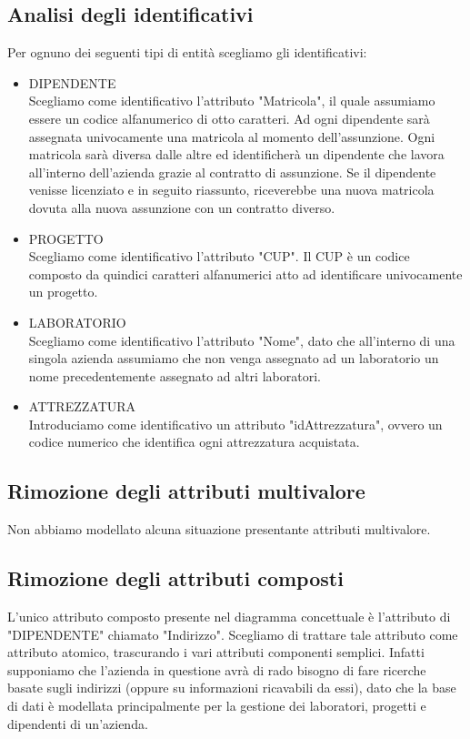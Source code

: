         \subsection{Analisi degli identificativi}
            Per ognuno dei seguenti tipi di entità scegliamo gli identificativi:
            \begin{itemize}
                \item DIPENDENTE\\
                Scegliamo come identificativo l'attributo "Matricola", il quale assumiamo essere un codice alfanumerico di otto caratteri.
                Ad ogni dipendente sarà assegnata univocamente una matricola al momento dell'assunzione. Ogni matricola sarà diversa dalle altre ed identificherà un dipendente che lavora all'interno dell'azienda grazie al contratto di assunzione. Se il dipendente venisse licenziato e in seguito riassunto, riceverebbe una nuova matricola dovuta alla nuova assunzione con un contratto diverso.
                \item PROGETTO\\
                Scegliamo come identificativo l'attributo "CUP". Il CUP è un codice composto da quindici caratteri alfanumerici atto ad identificare univocamente un progetto.
                \item LABORATORIO\\
                Scegliamo come identificativo l'attributo "Nome", dato che all'interno di una singola azienda assumiamo che non venga assegnato ad un laboratorio un nome precedentemente assegnato ad altri laboratori.
                \item ATTREZZATURA\\
                Introduciamo come identificativo un attributo "idAttrezzatura", ovvero un codice numerico che identifica ogni attrezzatura acquistata.
            \end{itemize}

        \subsection{Rimozione degli attributi multivalore}
            Non abbiamo modellato alcuna situazione presentante attributi multivalore.
                
        \subsection{Rimozione degli attributi composti}
            L'unico attributo composto presente nel diagramma concettuale è l'attributo di "DIPENDENTE" chiamato "Indirizzo". Scegliamo di trattare tale attributo come attributo atomico, trascurando i vari attributi componenti semplici. Infatti supponiamo che l'azienda in questione avrà di rado bisogno di fare ricerche basate sugli indirizzi (oppure su informazioni ricavabili da essi), dato che la base di dati è modellata principalmente per la gestione dei laboratori, progetti e dipendenti di un'azienda.
                

